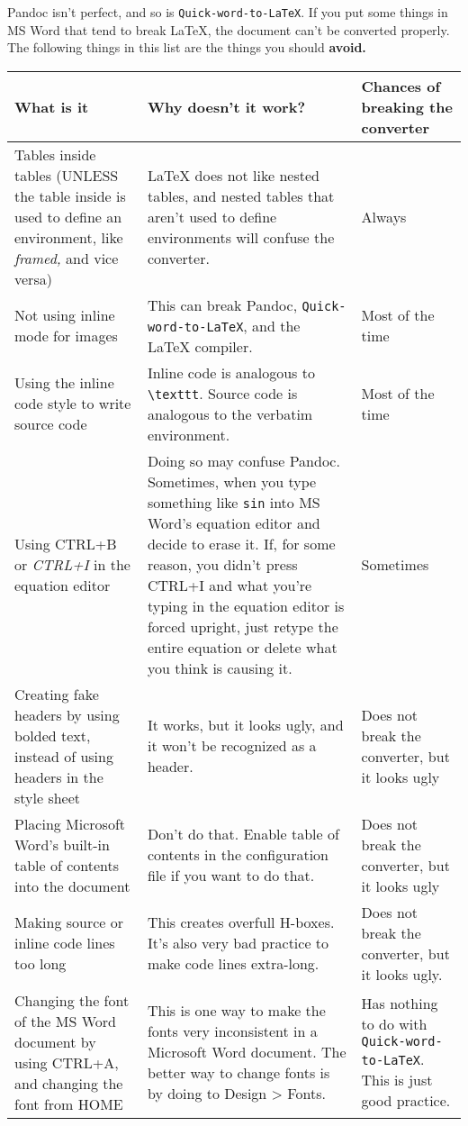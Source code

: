 \documentclass[12pt]{article}
\theoremstyle{plain}
\theoremstyle{remark}
\theoremstyle{definition}
\begin{document}
Pandoc isn't perfect, and so is \texttt{Quick-word-to-LaTeX}. If you put
some things in MS Word that tend to break LaTeX, the document can't be
converted properly. The following things in this list are the things you
should \textbf{avoid.}

\begin{table}[H]
\centering


\begin{tabular}{|m{13em}|m{13em}|m{13em}|}

\hline
What is it& Why doesn't it work?& Chances of breaking the converter\\ \hline
Tables inside tables (UNLESS the table inside is used to define an
environment, like \emph{framed,} and vice versa) & LaTeX does not like
nested tables, and nested tables that aren't used to define environments
will confuse the converter. & Always \\ \hline
Not using inline mode for images & This can break Pandoc,
\texttt{Quick-word-to-LaTeX}, and the LaTeX compiler. & Most of the
time \\ \hline
Using the inline code style to write source code & Inline code is
analogous to \texttt{\textbackslash{}texttt}. Source code is analogous
to the verbatim environment. & Most of the time \\ \hline
Using CTRL+B or \emph{CTRL+I} in the equation editor & Doing so may
confuse Pandoc. Sometimes, when you type something like \texttt{sin}
into MS Word's equation editor and decide to erase it. If, for some
reason, you didn't press CTRL+I and what you're typing in the equation
editor is forced upright, just retype the entire equation or delete what
you think is causing it. & Sometimes \\ \hline
Creating fake headers by using bolded text, instead of using headers in
the style sheet & It works, but it looks ugly, and it won't be
recognized as a header. & Does not break the converter, but it looks
ugly \\ \hline
Placing Microsoft Word's built-in table of contents into the document & Don't do that. Enable table of contents in the configuration file if you
want to do that. & Does not break the converter, but it looks ugly \\ \hline
Making source or inline code lines too long & This creates overfull
H-boxes. It's also very bad practice to make code lines extra-long. & Does not break the converter, but it looks ugly. \\ \hline
Changing the font of the MS Word document by using CTRL+A, and changing
the font from HOME & This is one way to make the fonts very inconsistent
in a Microsoft Word document. The better way to change fonts is by doing
to Design \textgreater{} Fonts. & Has nothing to do with
\texttt{Quick-word-to-LaTeX}. This is just good practice.
\\\hline
\end{tabular}

\end{table}
\end{document}
